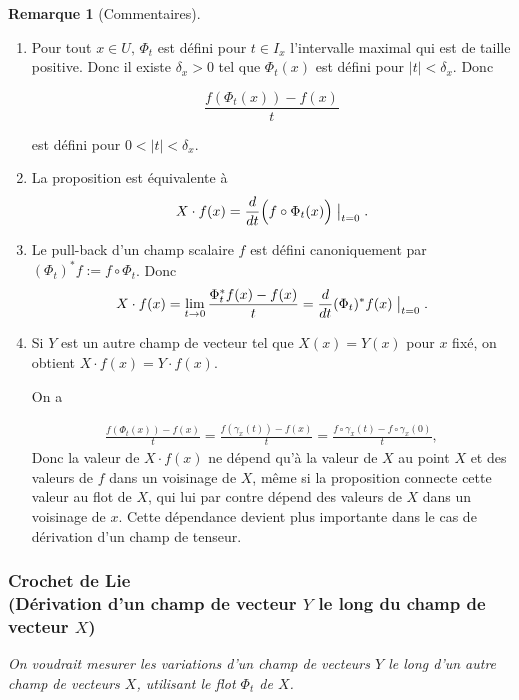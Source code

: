 \documentclass[french]{article}
\theoremstyle{definition}
\newtheorem{protoremark}{Remarque}[section]
\newenvironment{remark}
    {\colorlet{shadecolor}{yellow!5}\begin{shaded}\begin{protoremark}}
    {\end{protoremark}\end{shaded}}
\newcommand{\lesss}{<}
\newcommand{\less}{\lesss}
\newcommand{\biggg}{>}
\newcommand{\bg}{\biggg}
\begin{document}
\begin{remark}[Commentaires]

  \

  \begin{enumerate}
    \item   Pour tout \(x \in U,\, \Phi_t\) est défini pour \(t \in I_x\) l'intervalle maximal qui est de taille positive. Donc il existe \(\delta_x \bg 0\) tel que \(\Phi_t(x)\) est défini pour \(\left\lvert t \right\rvert \less \delta_x\). Donc

      \[ \frac{f(\Phi_t(x)) - f(x)}{t}\]

      est défini pour \(0 \less \left\lvert t \right\rvert \less \delta_x\).


\item
  La proposition est équivalente à
  \[
  X \cdot f(x) = \frac{d}{dt} \Big (f\circ \Phi_t(x)\Big) \bigm|_{t=0}.
  \]

    \item %
Le pull-back d'un champ scalaire $f$ est d\'efini canoniquement par $(\Phi_t)^{*}f := f\circ \Phi_t$.  Donc
    \[X \cdot f(x) = \lim_{t\to 0} \frac{\Phi_t ^{*}f(x)-f(x)}{t} = \frac{d}{dt}(\Phi_t)^{*}f(x) \bigm|_{t=0}. \]

    \item
     Si \(Y\) est un autre champ de vecteur tel que \(X(x) = Y(x)\) pour \(x\) fixé, on obtient \(X \cdot f(x) = Y \cdot f(x)\).

  On a

  \begin{gather*}
    \frac{f(\Phi_t(x))-f(x)}{t} = \frac{f(\gamma_x(t)) -f(x)}{t} = \frac{f \circ \gamma_x(t)-f \circ \gamma_x(0)}{t},
  \end{gather*} Donc la valeur de  $X \cdot f(x)$ ne d\'epend qu'\`a la valeur de $X$ au point $X$ et des valeurs de $f$ dans un voisinage de $X$, m\^eme si la proposition connecte cette valeur au flot de $X$, qui lui par contre d\'epend des valeurs de $X$ dans un voisinage de $x$. Cette d\'ependance devient plus importante dans le cas de d\'erivation d'un champ de tenseur.
  \end{enumerate}
\end{remark}
 \subsubsection{Crochet de Lie \\
 (D\'erivation d'un champ de vecteur $Y$  le long du champ de vecteur $X$)}

\emph{On voudrait mesurer les variations d'un champ de vecteurs \(Y\) le long d'un autre champ de vecteurs $X$, utilisant le flot \(\Phi_t\)  de $X$.}
\end{document}
